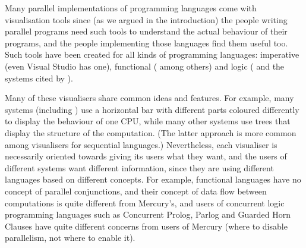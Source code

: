 %
%
%
%


Many parallel implementations of programming languages
come with visualisation tools
since (as we argued in the introduction)
the people writing parallel programs
need such tools to understand the actual behaviour of their programs,
and the people implementing those languages find them useful too.
Such tools have been created for all kinds of programming languages:
imperative (even Visual Studio has one),
functional
(\citet{edentraceviewer,loidl98:gransim,runciman93:profilingparfp} among others)
and logic (\citet{Foster96,vace}
and the systems cited by \citet{Gupta95parallelexecution}).

Many of these visualisers share common ideas and features.
For example, many systems (including \tscope)
use a horizontal bar with different parts coloured differently
to display the behaviour of one CPU,
while many other systems use trees
that display the structure of the computation.
(The latter approach is more common
among visualisers for sequential languages.)
Nevertheless, each visualiser is necessarily oriented
towards giving its users what they want,
and the users of different systems want different information,
since they are using different languages based on different concepts.
For example, functional languages have no concept of parallel conjunctions,
and their concept of data flow between computations
is quite different from Mercury's,
and users of concurrent logic programming languages
such as Concurrent Prolog, Parlog and Guarded Horn Clauses
have quite different concerns from users of Mercury
(where to disable parallelism, not where to enable it).

